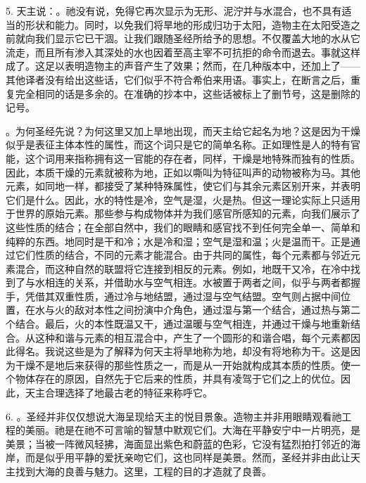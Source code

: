 5. 天主说：。祂没有说，免得它再次显示为无形、泥泞并与水混合，也不具有适当的形状和能力。同时，以免我们将旱地的形成归功于太阳，造物主在太阳受造之前就向我们显示它已干涸。让我们跟随圣经所给予的思想。不仅覆盖大地的水从它流走，而且所有渗入其深处的水也因着至高主宰不可抗拒的命令而退去。事就这样成了。这足以表明造物主的声音产生了效果；然而，在几种版本中，还加上了——其他译者没有给出这些话，它们似乎不符合希伯来用语。事实上，在断言之后，重复完全相同的话是多余的。在准确的抄本中，这些话被标上了删节号，这是删除的记号。\par

。为何圣经先说？为何这里又加上旱地出现，而天主给它起名为地？这是因为干燥似乎是表征主体本性的属性，而这个词只是它的简单名称。正如理性是人的特有官能，这个词用来指称拥有这一官能的存在者，同样，干燥是地特殊而独有的性质。因此，本质干燥的元素就被称为地，正如以嘶叫为特征叫声的动物被称为马。其他元素，如同地一样，都接受了某种特殊属性，使它们与其余元素区别开来，并表明它们是什么。因此，水的特性是冷，空气是湿，火是热。但这一理论实际上只适用于世界的原始元素。那些参与构成物体并为我们感官所感知的元素，向我们展示了这些性质的结合；在全部自然中，我们的眼睛和感官找不到任何完全单一、简单和纯粹的东西。地同时是干和冷；水是冷和湿；空气是湿和温；火是温而干。正是通过它们性质的结合，不同的元素才能混合。由于共同的属性，每个元素都与邻近元素混合，而这种自然的联盟将它连接到相反的元素。例如，地既干又冷，在冷中找到了与水相连的关系，并借助水与空气相连。水被置于两者之间，似乎与两者都握手，凭借其双重性质，通过冷与地结盟，通过湿与空气结盟。空气则占据中间位置，在水与火的敌对本性之间扮演中介角色，通过湿与第一个结合，通过热与第二个结合。最后，火的本性既温又干，通过温暖与空气相连，并通过干燥与地重新结合。从这种和谐与元素的相互混合中，产生了一个圆形的和谐合唱，每个元素都因此得名。我说这些是为了解释为何天主将旱地称为地，却没有将地称为干。这是因为干燥不是地后来获得的那些性质之一，而是从一开始就构成其本质的性质。使一个物体存在的原因，自然先于它后来的性质，并具有凌驾于它们之上的优位。因此，天主合理选择了地最古老的特征来称呼它。\par

6. 。圣经并非仅仅想说大海呈现给天主的悦目景象。造物主并非用眼睛观看祂工程的美丽。祂是在祂不可言喻的智慧中默观它们。大海在平静安宁中一片明亮，是美景；当被一阵微风轻拂，海面显出紫色和蔚蓝的色彩，它没有猛烈拍打邻近的海岸，而是似乎用平静的爱抚亲吻它们，这也同样是美景。然而，圣经并非由此让天主找到大海的良善与魅力。这里，工程的目的才造就了良善。\par

